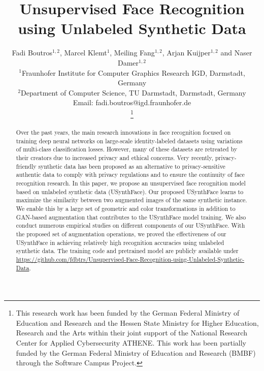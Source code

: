\documentclass[10pt,twocolumn,letterpaper]{ieeeconf}
\title{\LARGE \bf
Unsupervised Face Recognition using Unlabeled Synthetic Data 
}
\author{\parbox{16cm}{\centering
    {\large Fadi Boutros$^{1,2}$, Marcel Klemt$^1$, Meiling Fang$^{1,2}$, Arjan Kuijper$^{1,2}$ and Naser Damer$^{1,2}$}\\
    {\normalsize
    $^1$Fraunhofer Institute for Computer Graphics Research IGD,
Darmstadt, Germany\\
$^{2}$Department of Computer Science, TU Darmstadt,
Darmstadt, Germany\\
 Email: {fadi.boutros@igd.fraunhofer.de}
 }}
    \thanks{This research work has been funded by the German Federal Ministry of Education and Research and the Hessen State Ministry for Higher Education, Research and the Arts within their joint support of the National Research Center for Applied Cybersecurity ATHENE. This work has been partially funded by the German Federal Ministry of Education and Research (BMBF) through the Software Campus Project.}}
\begin{document}
\maketitle


\begin{abstract}
Over the past years, the main research innovations in face recognition focused on training deep neural networks on large-scale identity-labeled datasets using variations of multi-class classification losses. However, many of these datasets are retreated by their creators due to increased privacy and ethical concerns. Very recently, privacy-friendly synthetic data has been proposed as an alternative to privacy-sensitive authentic data to comply with privacy regulations and to ensure the continuity of face recognition research. In this paper, we propose an unsupervised face recognition model based on unlabeled synthetic data (USynthFace). 
Our proposed USynthFace learns to maximize the similarity between two augmented images of the same synthetic instance.  
We enable this by a large set of geometric and color transformations in addition to GAN-based augmentation that contributes to the USynthFace model training. 
We also conduct numerous empirical studies on different components of our USynthFace. With the proposed set of augmentation operations, we proved the effectiveness of our USynthFace in achieving relatively high recognition accuracies using unlabeled synthetic data. The training code and pretrained model are publicly available under \url{https://github.com/fdbtrs/Unsupervised-Face-Recognition-using-Unlabeled-Synthetic-Data}.


\end{abstract}
\end{document}
